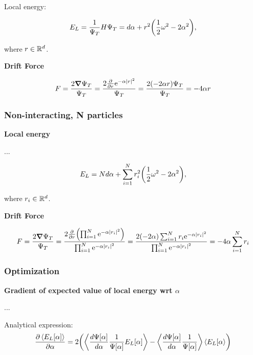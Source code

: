 Local energy: 

\begin{equation*}
    E_L = \frac{1}{\Psi_T} H \Psi_T = d \alpha + r^2 \qty(\frac{1}{2} \omega^2 - 2 \alpha^2),
\end{equation*}

where $r \in \mathbb{R}^d$.

\textbf{Drift Force}

\begin{equation*}
    F = \frac{2 \grad \Psi_T}{\Psi_T} = \frac{2 \pdv{r} \mathrm{e}^{-\alpha \abs{r}^2}}{\Psi_T} = \frac{2 \qty(-2 \alpha r) \Psi_T}{\Psi_T} = - 4 \alpha r
\end{equation*}

\subsubsection*{Non-interacting,  N particles}

\textbf{Local energy}

... 

\begin{equation*}
    E_L = N d \alpha + \sum_{i=1}^N r_i^2 \qty(\frac{1}{2} \omega^2 - 2 \alpha^2),
\end{equation*}

where $r_i \in \mathbb{R}^d$.

\textbf{Drift Force}

\begin{equation*}
    F = \frac{2 \grad \Psi_T}{\Psi_T} = \frac{2 \pdv{r} \qty( \prod_{i=1}^N \mathrm{e}^{-\alpha \abs{r_i}^2})}{\prod_{i=1}^N \mathrm{e}^{-\alpha \abs{r_i}^2}} = \frac{2 (-2 \alpha) \sum_{i=1}^N r_i \mathrm{e}^{-\alpha \abs{r_i}^2}}{\prod_{i=1}^N \mathrm{e}^{-\alpha \abs{r_i}^2}} = - 4 \alpha \sum_{i=1}^N r_i
\end{equation*}


\subsubsection*{Optimization}

\textbf{Gradient of expected value of local energy wrt $\alpha$}

...

Analytical expression: 
\begin{equation}\label{eq:grad_expval_E_L}
    \frac{\partial \expval{E_L[\mathbf{\alpha}]}}{\partial\mathbf{\alpha}} = 2\qty(\expval{\frac{d\Psi[\mathbf{\alpha}]}{d\mathbf{\alpha}}\frac{1}{\Psi[\mathbf{\alpha}]}E_L[\mathbf{\alpha}]} - \expval{\frac{d\Psi[\mathbf{\alpha}]}{d\mathbf{\alpha}}\frac{1}{\Psi[\mathbf{\alpha}]}}\expval{E_L[\mathbf{\alpha}})
\end{equation}


